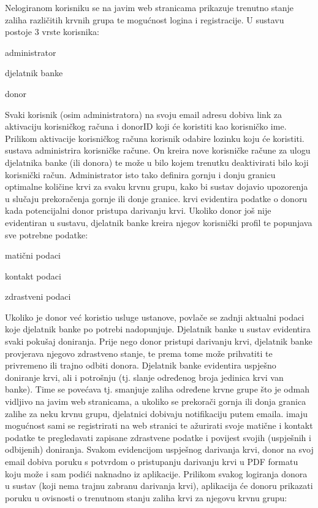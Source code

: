 		Nelogiranom korisniku se na javim web stranicama prikazuje trenutno stanje zaliha različitih krvnih grupa te mogućnost logina i registracije. U sustavu postoje 3 vrste korisnika:
		\begin{packed_item}
			\item{administrator}
			\item{djelatnik banke}
			\item{donor}
		\end{packed_item}
		Svaki korisnik (osim administratora) na svoju email adresu dobiva link za aktivaciju korisničkog računa i donorID koji će koristiti kao korisničko ime. Prilikom aktivacije korisničkog računa korisnik odabire lozinku koju će koristiti.
		sustava administrira korisničke račune. On kreira nove korisničke račune za ulogu djelatnika banke (ili donora) te može u bilo kojem trenutku deaktivirati bilo koji korisnički račun. Administrator isto tako definira gornju i donju granicu optimalne količine krvi za svaku krvnu grupu, kako bi sustav dojavio upozorenja u slučaju prekoračenja gornje ili donje granice.
		krvi evidentira podatke o donoru kada potencijalni donor pristupa darivanju krvi. Ukoliko donor još nije evidentiran u sustavu, djelatnik banke kreira njegov korisnički profil te popunjava sve potrebne podatke:
		\begin{packed_item}
			\item{matični podaci}
			\item{kontakt podaci}
			\item{zdrastveni podaci}
		\end{packed_item}
		Ukoliko je donor već koristio usluge ustanove, povlače se zadnji aktualni podaci koje djelatnik banke po potrebi nadopunjuje. Djelatnik banke u sustav evidentira svaki pokušaj doniranja. Prije nego donor pristupi darivanju krvi, djelatnik banke provjerava njegovo zdrastveno stanje, te prema tome može prihvatiti te privremeno ili trajno odbiti donora.
		Djelatnik banke evidentira uspješno doniranje krvi, ali i potrošnju (tj. slanje određenog broja jedinica krvi van banke). Time se povećava tj. smanjuje zaliha određene krvne grupe što je odmah vidljivo na javim web stranicama, a ukoliko se prekorači gornja ili donja granica zalihe za neku krvnu grupu, djelatnici dobivaju notifikaciju putem emaila.
		imaju mogućnost sami se registrirati na web stranici te ažurirati svoje matične i kontakt podatke te pregledavati zapisane zdrastvene podatke i povijest svojih (uspješnih i odbijenih) doniranja. Svakom evidencijom uspješnog darivanja krvi, donor na svoj email dobiva poruku s potvrdom o pristupanju darivanju krvi u PDF formatu koju može i sam podići naknadno iz aplikacije. Prilikom svakog logiranja donora u sustav (koji nema trajnu zabranu darivanja krvi), aplikacija će donoru prikazati poruku u ovisnosti o trenutnom stanju zaliha krvi za njegovu krvnu grupu:

